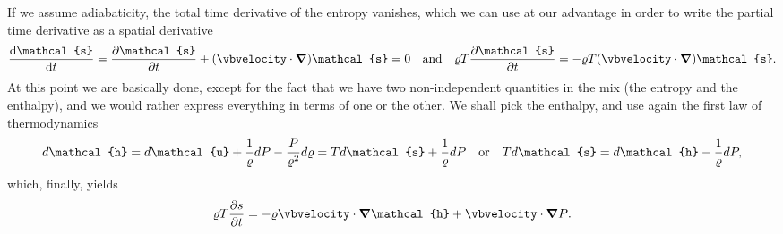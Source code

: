 If we assume adiabaticity, the total time derivative of the entropy vanishes, which
we can use at our advantage in order to write the partial time derivative as a spatial
derivative
\begin{align*}
  \dv{\mathcal{s}}{t} = \pdv{\mathcal{s}}{t} + (\vbvelocity \cdot \grad) \mathcal{s} = 0
  \quad\text{and}\quad
  \density T \pdv{\mathcal{s}}{t} = -\density T (\vbvelocity \cdot \grad) \mathcal{s}.
\end{align*}
At this point we are basically done, except for the fact that we have two non-independent
quantities in the mix (the entropy and the enthalpy), and we would rather express
everything in terms of one or the other. We shall pick the enthalpy, and use again
the first law of thermodynamics
\begin{align*}
  d\mathcal{h} = d\mathcal{u} + \frac{1}{\density}d\pressure -
  \frac{\pressure}{\density^2}d\density =
  Td\mathcal{s} + \frac{1}{\density}d\pressure
  \quad\text{or}\quad
  Td\mathcal{s} = d\mathcal{h} - \frac{1}{\density}d\pressure,
\end{align*}
which, finally, yields
\begin{align*}
  \density T \pdv{s}{t} =
  -\density \vbvelocity \cdot \grad{\mathcal{h}} +
  \vbvelocity \cdot \grad{\pressure}
  \mathcal{}.
\end{align*}

